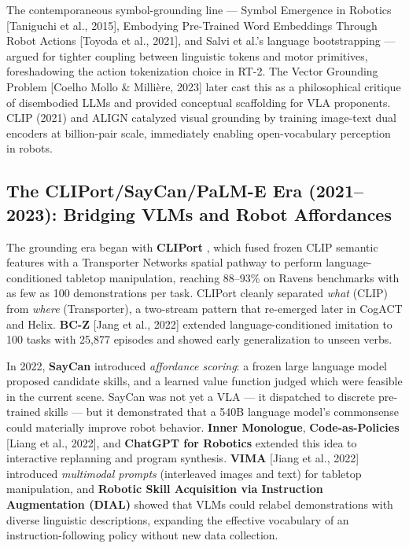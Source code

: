 \documentclass{article}
\begin{document}
The contemporaneous symbol-grounding line --- Symbol Emergence in Robotics {[}Taniguchi et al., 2015{]}, Embodying Pre-Trained Word Embeddings Through Robot Actions {[}Toyoda et al., 2021{]}, and Salvi et al.'s language bootstrapping --- argued for tighter coupling between linguistic tokens and motor primitives, foreshadowing the action tokenization choice in RT-2. The Vector Grounding Problem {[}Coelho Mollo \& Millière, 2023{]} later cast this as a philosophical critique of disembodied LLMs and provided conceptual scaffolding for VLA proponents. CLIP (2021) and ALIGN catalyzed visual grounding by training image-text dual encoders at billion-pair scale, immediately enabling open-vocabulary perception in robots.

\subsection{The CLIPort/SayCan/PaLM-E Era (2021--2023): Bridging VLMs and Robot Affordances}\label{the-cliportsaycanpalm-e-era-20212023-bridging-vlms-and-robot-affordances}

The grounding era began with \textbf{CLIPort} \cite{shridhar2021cliportwhatandwher}, which fused frozen CLIP semantic features with a Transporter Networks spatial pathway to perform language-conditioned tabletop manipulation, reaching 88--93\% on Ravens benchmarks with as few as 100 demonstrations per task. CLIPort cleanly separated \emph{what} (CLIP) from \emph{where} (Transporter), a two-stream pattern that re-emerged later in CogACT and Helix. \textbf{BC-Z} {[}Jang et al., 2022{]} extended language-conditioned imitation to 100 tasks with 25,877 episodes and showed early generalization to unseen verbs.

In 2022, \textbf{SayCan} \cite{ahn2022doasicannotasisayg} introduced \emph{affordance scoring}: a frozen large language model proposed candidate skills, and a learned value function judged which were feasible in the current scene. SayCan was not yet a VLA --- it dispatched to discrete pre-trained skills --- but it demonstrated that a 540B language model's commonsense could materially improve robot behavior. \textbf{Inner Monologue}, \textbf{Code-as-Policies} {[}Liang et al., 2022{]}, and \textbf{ChatGPT for Robotics} \cite{vemprala2024chatgptforrobotics} extended this idea to interactive replanning and program synthesis. \textbf{VIMA} {[}Jiang et al., 2022{]} introduced \emph{multimodal prompts} (interleaved images and text) for tabletop manipulation, and \textbf{Robotic Skill Acquisition via Instruction Augmentation (DIAL)} \cite{xiao2023roboticskillacquis} showed that VLMs could relabel demonstrations with diverse linguistic descriptions, expanding the effective vocabulary of an instruction-following policy without new data collection.
\end{document}
